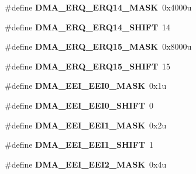 \begin{DoxyCompactItemize}
\item 
\#define {\bfseries D\+M\+A\+\_\+\+E\+R\+Q\+\_\+\+E\+R\+Q14\+\_\+\+M\+A\+SK}~0x4000u\hypertarget{group__DMA__Register__Masks_ga41e772c4e32bb0c2546bd32b9207aece}{}\label{group__DMA__Register__Masks_ga41e772c4e32bb0c2546bd32b9207aece}

\item 
\#define {\bfseries D\+M\+A\+\_\+\+E\+R\+Q\+\_\+\+E\+R\+Q14\+\_\+\+S\+H\+I\+FT}~14\hypertarget{group__DMA__Register__Masks_gaa8b288df3c11c83516e460ec8f1c06b6}{}\label{group__DMA__Register__Masks_gaa8b288df3c11c83516e460ec8f1c06b6}

\item 
\#define {\bfseries D\+M\+A\+\_\+\+E\+R\+Q\+\_\+\+E\+R\+Q15\+\_\+\+M\+A\+SK}~0x8000u\hypertarget{group__DMA__Register__Masks_ga6152f3575742083b05d6df10bd9d09e5}{}\label{group__DMA__Register__Masks_ga6152f3575742083b05d6df10bd9d09e5}

\item 
\#define {\bfseries D\+M\+A\+\_\+\+E\+R\+Q\+\_\+\+E\+R\+Q15\+\_\+\+S\+H\+I\+FT}~15\hypertarget{group__DMA__Register__Masks_ga49ce30d8d6925a45dfc85fdf08b71bfd}{}\label{group__DMA__Register__Masks_ga49ce30d8d6925a45dfc85fdf08b71bfd}

\item 
\#define {\bfseries D\+M\+A\+\_\+\+E\+E\+I\+\_\+\+E\+E\+I0\+\_\+\+M\+A\+SK}~0x1u\hypertarget{group__DMA__Register__Masks_gaacd526dbbb455151535c6e8d7e371477}{}\label{group__DMA__Register__Masks_gaacd526dbbb455151535c6e8d7e371477}

\item 
\#define {\bfseries D\+M\+A\+\_\+\+E\+E\+I\+\_\+\+E\+E\+I0\+\_\+\+S\+H\+I\+FT}~0\hypertarget{group__DMA__Register__Masks_gac4abb698bc75b24811557b2037d828c6}{}\label{group__DMA__Register__Masks_gac4abb698bc75b24811557b2037d828c6}

\item 
\#define {\bfseries D\+M\+A\+\_\+\+E\+E\+I\+\_\+\+E\+E\+I1\+\_\+\+M\+A\+SK}~0x2u\hypertarget{group__DMA__Register__Masks_gabb59616391e640e07162d0d33c0382d9}{}\label{group__DMA__Register__Masks_gabb59616391e640e07162d0d33c0382d9}

\item 
\#define {\bfseries D\+M\+A\+\_\+\+E\+E\+I\+\_\+\+E\+E\+I1\+\_\+\+S\+H\+I\+FT}~1\hypertarget{group__DMA__Register__Masks_ga9c162765569a8cc74e648841337f09e2}{}\label{group__DMA__Register__Masks_ga9c162765569a8cc74e648841337f09e2}

\item 
\#define {\bfseries D\+M\+A\+\_\+\+E\+E\+I\+\_\+\+E\+E\+I2\+\_\+\+M\+A\+SK}~0x4u\hypertarget{group__DMA__Register__Masks_ga24c1e04e6f4916148ed252a53df2055f}{}\label{group__DMA__Register__Masks_ga24c1e04e6f4916148ed252a53df2055f}


\end{DoxyCompactItemize}
